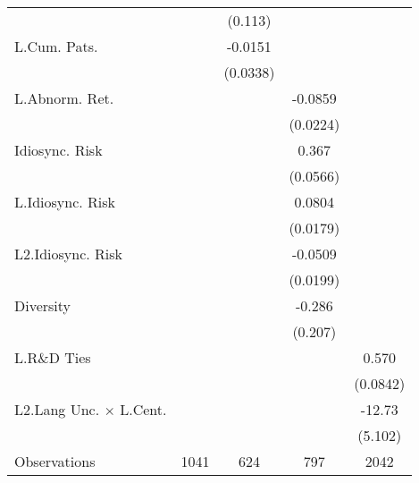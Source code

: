 \begin{table}
\begin{center}
{\begin{tabular}{l*{4}{c}}
                    &                     &     (0.113)         &                     &                     \\
L.Cum. Pats.        &                     &     -0.0151         &                     &                     \\
                    &                     &    (0.0338)         &                     &                     \\
L.Abnorm. Ret.      &                     &                     &     -0.0859\sym{***}&                     \\
                    &                     &                     &    (0.0224)         &                     \\
Idiosync. Risk      &                     &                     &       0.367\sym{***}&                     \\
                    &                     &                     &    (0.0566)         &                     \\
L.Idiosync. Risk    &                     &                     &      0.0804\sym{***}&                     \\
                    &                     &                     &    (0.0179)         &                     \\
L2.Idiosync. Risk   &                     &                     &     -0.0509\sym{*}  &                     \\
                    &                     &                     &    (0.0199)         &                     \\
Diversity           &                     &                     &      -0.286         &                     \\
                    &                     &                     &     (0.207)         &                     \\
L.R\&D Ties         &                     &                     &                     &       0.570\sym{***}\\
                    &                     &                     &                     &    (0.0842)         \\
L2.Lang Unc. $\times$ L.Cent.&                     &                     &                     &      -12.73\sym{*}  \\
                    &                     &                     &                     &     (5.102)         \\
\hline
Observations        &        1041         &         624         &         797         &        2042         \\

\end{tabular}}
\end{center}
\end{table}
